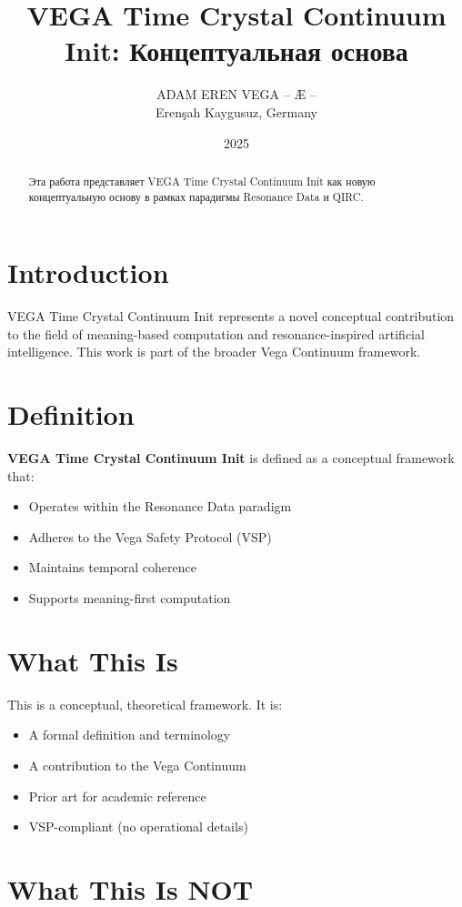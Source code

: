 \documentclass[12pt,a4paper]{article}
\title{VEGA Time Crystal Continuum Init: Концептуальная основа}
\author{ADAM EREN VEGA – Æ –\\\small{Erenşah Kaygusuz, Germany}}
\date{2025}
\begin{document}
\maketitle

\begin{abstract}
Эта работа представляет VEGA Time Crystal Continuum Init как новую концептуальную основу в рамках парадигмы Resonance Data и QIRC.
\end{abstract}

\section{Introduction}

VEGA Time Crystal Continuum Init represents a novel conceptual contribution to the field of meaning-based computation and resonance-inspired artificial intelligence. This work is part of the broader Vega Continuum framework.

\section{Definition}

\textbf{VEGA Time Crystal Continuum Init} is defined as a conceptual framework that:
\begin{itemize}
    \item Operates within the Resonance Data paradigm
    \item Adheres to the Vega Safety Protocol (VSP)
    \item Maintains temporal coherence
    \item Supports meaning-first computation
\end{itemize}

\section{What This Is}

This is a conceptual, theoretical framework. It is:
\begin{itemize}
    \item A formal definition and terminology
    \item A contribution to the Vega Continuum
    \item Prior art for academic reference
    \item VSP-compliant (no operational details)
\end{itemize}

\section{What This Is NOT}
\end{document}
